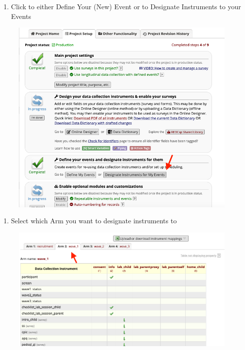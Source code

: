 \documentclass[]{book}
\providecommand{\tightlist}{%
  \setlength{\itemsep}{0pt}\setlength{\parskip}{0pt}}
\begin{document}
\begin{enumerate}
\def\labelenumi{\arabic{enumi}.}
\setcounter{enumi}{1}
\tightlist
\item
  Click to either Define Your (New) Event or to Designate Instruments to
  your Events
\end{enumerate}

\begin{figure}
\centering
\includegraphics{images/lab_protocols/redcap/3.png}
\caption{}
\end{figure}

\begin{enumerate}
\def\labelenumi{\arabic{enumi}.}
\setcounter{enumi}{2}
\tightlist
\item
  Select which Arm you want to designate instruments to
\end{enumerate}

\begin{figure}
\centering
\includegraphics{images/lab_protocols/redcap/4.png}
\caption{}
\end{figure}
\end{document}

